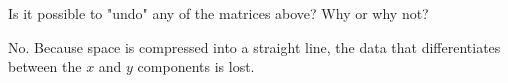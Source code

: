 Is it possible to "undo" any of the matrices above? Why or why not?

\begin{solution}
No. Because space is compressed into a straight line, the data that differentiates between the $x$ and $y$ components is lost.
\end{solution}